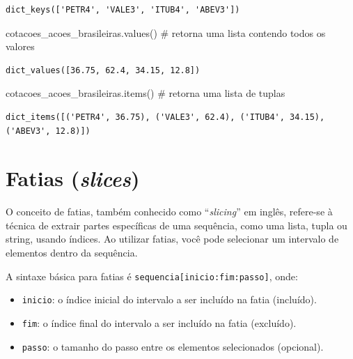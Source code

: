 \documentclass[
  portuguese,
  letterpaper,
  DIV=11,
  numbers=noendperiod]{scrreprt}
\newenvironment{Shaded}{\begin{snugshade}}{\end{snugshade}}
\newcommand{\CommentTok}[1]{\textcolor[rgb]{0.37,0.37,0.37}{#1}}
\newcommand{\NormalTok}[1]{\textcolor[rgb]{0.00,0.23,0.31}{#1}}
\theoremstyle{definition}
\theoremstyle{remark}
\begin{document}
\begin{verbatim}
dict_keys(['PETR4', 'VALE3', 'ITUB4', 'ABEV3'])
\end{verbatim}

\begin{Shaded}
\begin{Highlighting}[]
\NormalTok{cotacoes\_acoes\_brasileiras.values() }\CommentTok{\# retorna uma lista contendo todos os valores}
\end{Highlighting}
\end{Shaded}

\begin{verbatim}
dict_values([36.75, 62.4, 34.15, 12.8])
\end{verbatim}

\begin{Shaded}
\begin{Highlighting}[]
\NormalTok{cotacoes\_acoes\_brasileiras.items() }\CommentTok{\# retorna uma lista de tuplas}
\end{Highlighting}
\end{Shaded}

\begin{verbatim}
dict_items([('PETR4', 36.75), ('VALE3', 62.4), ('ITUB4', 34.15), ('ABEV3', 12.8)])
\end{verbatim}

\section{\texorpdfstring{Fatias
(\emph{slices})}{Fatias (slices)}}\label{fatias-slices}

O conceito de fatias, também conhecido como ``\emph{slicing}'' em
inglês, refere-se à técnica de extrair partes específicas de uma
sequência, como uma lista, tupla ou string, usando índices. Ao utilizar
fatias, você pode selecionar um intervalo de elementos dentro da
sequência.

A sintaxe básica para fatias é \texttt{sequencia{[}inicio:fim:passo{]}},
onde:

\begin{itemize}
\item
  \texttt{inicio}: o índice inicial do intervalo a ser incluído na fatia
  (incluído).
\item
  \texttt{fim}: o índice final do intervalo a ser incluído na fatia
  (excluído).
\item
  \texttt{passo}: o tamanho do passo entre os elementos selecionados
  (opcional).
\end{itemize}
\end{document}
